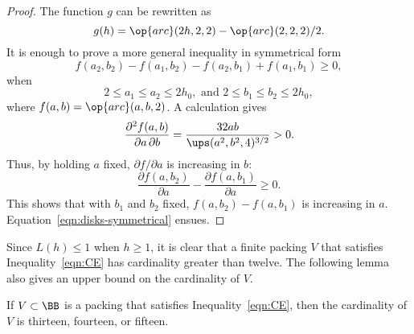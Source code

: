 \begin{proof}
The function $g$ can be rewritten as
\[
g(h) = \op{arc}(2h,2,2) - \op{arc}(2,2,2)/2.
\]
It is enough to prove a  more general inequality in
  symmetrical form
\begin{equation}\label{eqn:disks-symmetrical}
f(a_2,b_2) - f(a_1,b_2) - f(a_2,b_1) + f(a_1,b_1)\ge0, 
\end{equation}
when
\[
2\le a_1 \le a_2 \le 2h_0,\text{ and } 2\le b_1\le b_2 \le 2h_0,
\]
where $f(a,b) = \op{arc}(a,b,2)$.  
A calculation gives
\[
 \frac {\partial^2 f(a,b)}{\partial a\,\partial b} = \frac{32 a b}{\ups(a^2,b^2,4)^{3/2}} > 0.
\]
Thus, by holding $a$ fixed, $\partial f/\partial a$ is increasing in $b$:
\[
 \frac {\partial f(a,b_2) } {\partial a} -\frac{\partial f(a,b_1)}{\partial a} \ge 0.
\]
This shows that with $b_1$ and $b_2$ fixed, 
$f(a,b_2)-f(a,b_1)$ is increasing in $a$.
Equation~\ref{eqn:disks-symmetrical} ensues.
\end{proof}


Since $L(h)\le 1$ when $h\ge1$, it is clear that a finite packing $V$
that satisfies Inequality~\ref{eqn:CE} has cardinality greater than twelve.
The following lemma also gives an upper bound on the cardinality of $V$.

\begin{lemma}[]\label{lemma:13-14}  %
  If $V\subset \BB$ is a packing that satisfies
  Inequality~\ref{eqn:CE}, then the cardinality of $V$ is thirteen,
  fourteen, or fifteen.
\end{lemma}


